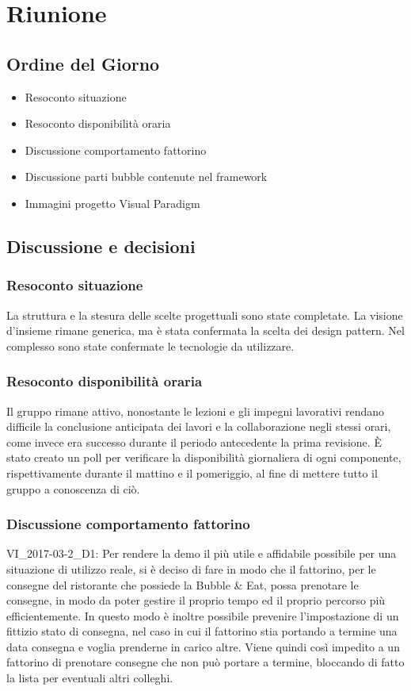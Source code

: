 \section{Riunione}
\subsection{Ordine del Giorno}
\begin{itemize}
	\item Resoconto situazione
	\item Resoconto disponibilità oraria
	\item Discussione comportamento fattorino
	\item Discussione parti bubble contenute nel framework 
	\item Immagini progetto Visual Paradigm
\end{itemize}

\subsection{Discussione e decisioni}

\subsubsection{Resoconto situazione}
La struttura e la stesura delle scelte progettuali sono state completate. La visione d'insieme rimane generica, ma è stata confermata la scelta dei design pattern. Nel complesso sono state confermate le tecnologie da utilizzare.

\subsubsection{Resoconto disponibilità oraria}
Il gruppo rimane attivo, nonostante le lezioni e gli impegni lavorativi rendano difficile la conclusione anticipata dei lavori e la collaborazione negli stessi orari, come invece era successo durante il periodo antecedente la prima revisione. È stato creato un poll per verificare la disponibilità giornaliera di ogni componente, rispettivamente durante il mattino e il pomeriggio, al fine di mettere tutto il gruppo a conoscenza di ciò.

\subsubsection{Discussione comportamento fattorino}
VI_2017-03-2_D1: Per rendere la demo il più utile e affidabile possibile per una situazione di utilizzo reale, si è deciso di fare in modo che il fattorino, per le consegne del ristorante che possiede la Bubble \& Eat, possa prenotare le consegne, in modo da poter gestire il proprio tempo ed il proprio percorso più efficientemente. In questo modo è inoltre possibile prevenire l'impostazione di un fittizio stato di consegna, nel caso in cui il fattorino stia portando a termine una data consegna e voglia prenderne in carico altre. Viene quindi così impedito a un fattorino di prenotare consegne che non può portare a termine, bloccando di fatto la lista per eventuali altri colleghi.

